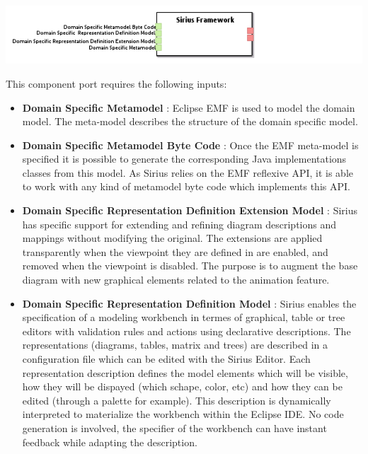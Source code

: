 \documentclass{gemoc} %
\begin{document}
\begin{center}
\includegraphics*[trim=0.0cm 0.0cm 0cm 0.0cm, clip=true]{../images/generated/Generated_Sirius_Framework.png}
\end{center}

This component port requires the following inputs:
\begin{itemize}
  \item \textbf{Domain Specific Metamodel} :
Eclipse EMF is used to model the domain model. The meta-model describes the structure of the domain specific model.
  \item \textbf{Domain Specific Metamodel Byte Code} :
Once the EMF meta-model is specified it is possible to generate the corresponding Java implementations classes from this model. As Sirius relies on the EMF reflexive API, it is able to work with any kind of metamodel byte code which implements this API.
  \item \textbf{Domain Specific Representation Definition Extension Model} :
Sirius has specific support for extending and refining diagram descriptions and mappings without modifying the original. The extensions are applied transparently when the viewpoint they are defined in are enabled, and removed when the viewpoint is disabled.  The purpose is to augment the base diagram with new graphical elements related to the animation feature.
  \item \textbf{Domain Specific  Representation Definition Model} :
Sirius enables the specification of a modeling workbench in termes of graphical, table or tree editors with validation rules and actions using declarative descriptions. The representations (diagrams, tables, matrix and trees) are described in a configuration file which can be edited with the Sirius Editor. Each representation description defines the model elements which will be visible, how they will be dispayed (which schape, color, etc) and how they can be edited (through a palette for example). This description is dynamically interpreted to materialize the workbench within the Eclipse IDE. No code generation is involved, the specifier of the workbench can have instant feedback while adapting the description.  
\end{itemize}
\end{document}
